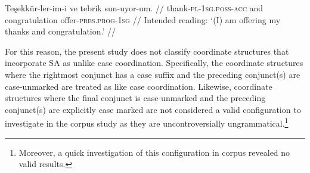 \pex[* = *, glspace=!1em,everygla={},everyglb={},aboveglbskip=-.15ex, interpartskip=15pt]
\label{Turkish-SA1} \begingl
\gla \ljudge{*}Teşekkür-ler-im-i ve tebrik sun-uyor-um. //
\glb  { }thank-\textsc{pl}-\textsc{1sg.poss}-\textsc{acc} and congratulation offer-\textsc{pres.prog}-\textsc{1sg} //
\glft { }Intended reading: `(I) am offering my thanks and congratulation.' //
\endgl
\xe

\begin{sloppypar}
For this reason, the present study does not classify coordinate structures that incorporate SA as unlike case coordination. Specifically, the coordinate structures where the rightmost conjunct has a case suffix and the preceding conjunct(s) are case-unmarked are treated as like case coordination. Likewise, coordinate structures where the final conjunct is case-unmarked and the preceding conjunct(s) are explicitly case marked are not considered a valid configuration to investigate in the corpus study as they are uncontroversially ungrammatical.\footnote{Moreover, a quick investigation of this configuration in corpus revealed no valid results.}
\end{sloppypar}